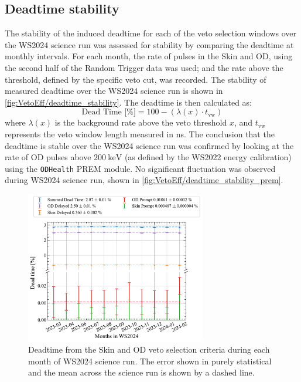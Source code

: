 \subsection{Deadtime stability}\label{sec:VetoEff/DeadtimeStability}
The stability of the induced deadtime for each of the veto selection windows over the WS2024 science run was assessed for stability by comparing the deadtime at monthly intervals. For each month, the rate of pulses in the Skin and OD, using the second half of the Random Trigger data was used; and the rate above the threshold, defined by the specific veto cut, was recorded. The stability of measured deadtime over the WS2024 science run is shown in \autoref{fig:VetoEff/deadtime_stability}.
The deadtime is then calculated as:
\begin{equation}
	\textrm{Dead Time [\%]} = 100 - (\lambda(x)\cdot t_{\text{vw}})
\end{equation}
where $\lambda(x)$ is the background rate above the veto threshold $x$, and $t_{\text{vw}}$ represents the veto window length measured in ns.
The conclusion that the deadtime is stable over the WS2024 science run was confirmed by looking at the rate of OD pulses above $200~\text{keV}$ (as defined by the WS2022 energy calibration) using the \lstinline{ODHealth} PREM module. No significant fluctuation was observed during WS2024 science run, shown in \autoref{fig:VetoEff/deadtime_stability_prem}.
\begin{figure}[!ht]
	\centering
	\includegraphics[width=0.7\textwidth]{figures/VetoEfficiency/SR3DeadTimeAll_withMean.pdf}
	\caption[Deadtime from the Skin and OD veto selection criteria during each month of WS2024 science run.]{Deadtime from the Skin and OD veto selection criteria during each month of WS2024 science run. The error shown in purely statistical and the mean across the science run is shown by a dashed line.}
	\label{fig:VetoEff/deadtime_stability}
\end{figure}
